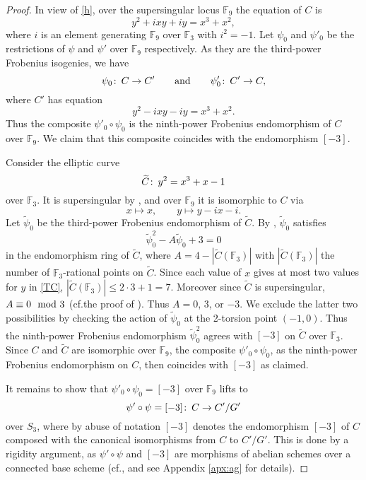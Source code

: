 \documentclass{gtpart}
\theoremstyle{definition}
\theoremstyle{remark}
\def\co{\colon\thinspace}
\newcommand{\mb}[1]{\mathbb{#1}}
\newcommand{\cf}{cf.\thinspace}
\newcommand{\BF}{{\mb F}}
\newcommand{\TC}{\widetilde{C}}
\newcommand{\TP}{\widetilde{\psi}}
\newcommand{\md}{~~{\rm mod}~}
\newcommand{\ad}{{\rm and}}
\begin{document}
\begin{proof}
 In view of \eqref{h}, over the supersingular locus $\BF_9$ the equation of $C$ is 
 \[
  y^2 + i x y + i y = x^3 + x^2, 
 \]
 where $i$ is an element generating $\BF_9$ over $\BF_3$ with $i^2 = -1$.  
 Let $\psi_0$ and $\psi'_0$ be the restrictions of $\psi$ and $\psi'$ over $\BF_9$ respectively.  
 As they are the third-power Frobenius isogenies, we have 
 \[
  \psi_0 \co C \to C' \qquad \ad \qquad \psi'_0 \co C' \to C, 
 \]
 where $C'$ has equation 
 \[
  y^2 - i x y - i y = x^3 + x^2.  
 \]
 Thus the composite $\psi'_0 \circ \psi_0$ is the ninth-power Frobenius endomorphism of $C$ over $\BF_9$.  
 We claim that this composite coincides with the endomorphism $[-3]$.  

 Consider the elliptic curve 
 \begin{equation}
 \label{TC}
  \TC \co y^2 = x^3 + x - 1 
 \end{equation}
 over $\BF_3$.  It is supersingular by \cite[V.4.1a]{AEC}, and over $\BF_9$ it is isomorphic to $C$ via 
 \[
  x \mapsto x, \qquad y \mapsto y - i x - i.  
 \]
 Let $\TP_0$ be the third-power Frobenius endomorphism of $\TC$.  
 By \cite[V.2.3.1b]{AEC}, $\TP_0$ satisfies 
 \[
  \TP_0^2 - A \TP_0 + 3 = 0 
 \]
 in the endomorphism ring of $\TC$, where $A = 4 - |\TC(\BF_3)|$ with $|\TC(\BF_3)|$ the number of $\BF_3$-rational points on $\TC$.  
 Since each value of $x$ gives at most two values for $y$ in \eqref{TC}, $|\TC(\BF_3)| \leq 2 \cdot 3 + 1 = 7$.  
 Moreover since $\TC$ is supersingular, $A \equiv 0 \md 3$ (\cf the proof of \cite[V.4.1a]{AEC}).  
 Thus $A = 0$, 3, or $-3$.  
 We exclude the latter two possibilities by checking the action of $\TP_0$ at the 2-torsion point $(-1,0)$.  
 Thus the ninth-power Frobenius endomorphism $\TP_0^2$ agrees with $[-3]$ on $\TC$ over $\BF_3$.  
 Since $C$ and $\TC$ are isomorphic over $\BF_9$, the composite $\psi'_0 \circ \psi_0$, as the ninth-power Frobenius endomorphism on $C$, then coincides with $[-3]$ as claimed.  

 It remains to show that $\psi'_0 \circ \psi_0 = [-3]$ over $\BF_9$ lifts to 
 \[
  \psi' \circ \psi = [-3] \co C \to C'/G' 
 \]
 over $S_3$, where by abuse of notation $[-3]$ denotes the endomorphism $[-3]$ of $C$ composed with the canonical isomorphisms from $C$ to $C'/G'$.  
 This is done by a rigidity argument, as $\psi' \circ \psi$ and $[-3]$ are morphisms of abelian schemes over a connected base scheme 
 (\cf \cite[Proposition 6.1 and Corollary 6.2]{GIT}, and see Appendix \ref{apx:ag} for details).  
\end{proof}
\end{document}
